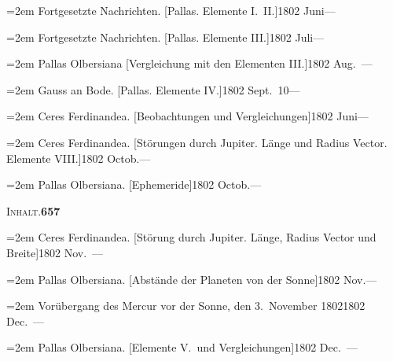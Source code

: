 \documentclass[12pt,a4paper]{article}
\begin{document}
{{\vspace{0.5mm}
\noindent\hangindent=2em
Fortgesetzte Nachrichten. [Pallas. Elemente I.\ II.]\hfill 1802 Juni\quad ---

\vspace{0.5mm}
\noindent\hangindent=2em
Fortgesetzte Nachrichten. [Pallas. Elemente III.]\hfill 1802 Juli\quad ---

\vspace{0.5mm}
\noindent\hangindent=2em
Pallas Olbersiana [Vergleichung mit den Elementen III.]\hfill 1802 Aug.\ ---

\vspace{0.5mm}
\noindent\hangindent=2em
Gauss an Bode. [Pallas. Elemente IV.]\hfill 1802 Sept.\ 10\quad ---

\vspace{0.5mm}
\noindent\hangindent=2em
Ceres Ferdinandea. [Beobachtungen und Vergleichungen]\hfill 1802 Juni\quad ---

\vspace{0.5mm}
\noindent\hangindent=2em
Ceres Ferdinandea. [St\"orungen durch Jupiter. L\"ange und Radius Vector. Elemente VIII.]\hfill 1802 Octob.\quad ---

\vspace{0.5mm}
\noindent\hangindent=2em
Pallas Olbersiana. [Ephemeride]\hfill 1802 Octob.\quad ---

\newpage

\begin{center}\small\textsc{Inhalt.}\quad\textbf{657}\end{center}

\vspace{0.3cm}

{\small
\noindent\hangindent=2em
Ceres Ferdinandea. [St\"orung durch Jupiter. L\"ange, Radius Vector und Breite]\hfill 1802 Nov.\ ---

\vspace{0.5mm}
\noindent\hangindent=2em
Pallas Olbersiana. [Abst\"ande der Planeten von der Sonne]\hfill 1802 Nov.\quad ---

\vspace{0.5mm}
\noindent\hangindent=2em
Vor\"ubergang des Mercur vor der Sonne, den 3.\ November 1802\hfill 1802 Dec.\ ---

\vspace{0.5mm}
\noindent\hangindent=2em
Pallas Olbersiana. [Elemente V.\ und Vergleichungen]\hfill 1802 Dec.\ ---

}}}
\end{document}
